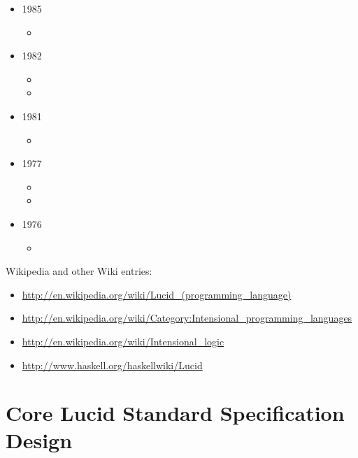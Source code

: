 \documentclass{easychair}
\begin{document}
\begin{itemize}
\item 1985
\begin{itemize}
	\item 
{}
\end{itemize}


\item 1982
\begin{itemize}
	\item
{}
	\item
{}
\end{itemize}


\item 1981
\begin{itemize}
	\item 
{}
\end{itemize}


\item 1977
\begin{itemize}
	\item 
{}
	\item 
{}
\end{itemize}


\item 1976
\begin{itemize}
	\item 
{}
\end{itemize}

\end{itemize}



\noindent
Wikipedia and other Wiki entries:

\begin{itemize}
	\item \url{http://en.wikipedia.org/wiki/Lucid_(programming_language)}
	\item \url{http://en.wikipedia.org/wiki/Category:Intensional_programming_languages}
	\item \url{http://en.wikipedia.org/wiki/Intensional_logic}
	\item \url{http://www.haskell.org/haskellwiki/Lucid}
\end{itemize}


\section{Core Lucid Standard Specification Design}
\end{document}

